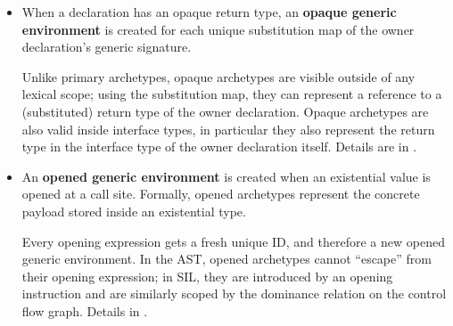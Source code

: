 \documentclass[../generics]{subfiles}
\begin{document}
\begin{itemize}
\item When a declaration has an opaque return type, an \textbf{opaque generic environment} is created for each unique substitution map of the owner declaration's generic signature.
\begin{quote}
\end{quote}
Unlike primary archetypes, opaque archetypes are visible outside of any lexical scope; using the substitution map, they can represent a reference to a (substituted) return type of the owner declaration. Opaque archetypes are also valid inside interface types, in particular they also represent the return type in the interface type of the owner declaration itself. Details are in .
\item An \textbf{opened generic environment} is created when an existential value is opened at a call site. Formally, opened archetypes represent the concrete payload stored inside an existential type.
\begin{quote}
\end{quote}
Every opening expression gets a fresh unique ID, and therefore a new opened generic environment. In the AST, opened archetypes cannot ``escape'' from their opening expression; in SIL, they are introduced by an opening instruction and are similarly scoped by the dominance relation on the control flow graph. Details in .
\end{itemize}
\end{document}
